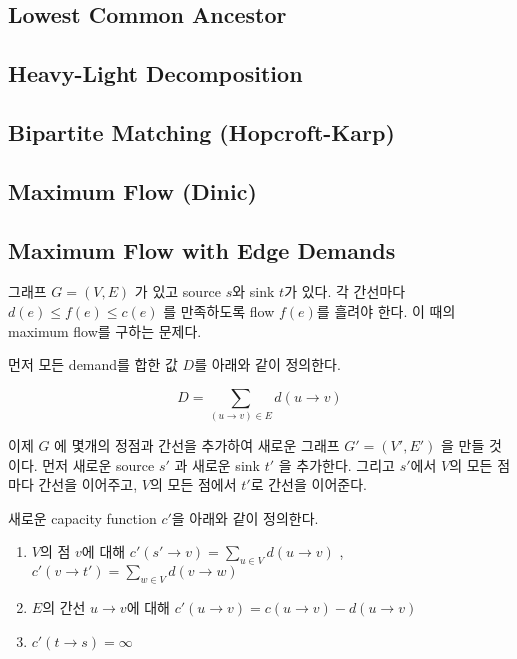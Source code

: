 \documentclass[10pt,landscape,a4paper,twocolumn]{article}
\begin{document}
\subsection{Lowest Common Ancestor}


\subsection{Heavy-Light Decomposition}


\subsection{Bipartite Matching (Hopcroft-Karp)}


\subsection{Maximum Flow (Dinic)}


\subsection{Maximum Flow with Edge Demands}

그래프 $G=(V,E)$ 가 있고 source $s$와 sink $t$가 있다. 각 간선마다 $d(e) \leq f(e) \leq c(e)$ 를 만족하도록 flow $f(e)$를 흘려야 한다. 이 때의 maximum flow를 구하는 문제다.

먼저 모든 demand를 합한 값 $D$를 아래와 같이 정의한다.

\begin{displaymath}
D = \sum_{(u \to v) \in E} d(u \to v)
\end{displaymath}

이제 $G$ 에 몇개의 정점과 간선을 추가하여 새로운 그래프 $G'=(V',E')$ 을 만들 것이다. 먼저 새로운 source $s'$ 과 새로운 sink $t'$ 을 추가한다. 그리고 $s'$에서 $V$의 모든 점마다 간선을 이어주고, $V$의 모든 점에서 $t'$로 간선을 이어준다.

새로운 capacity function $c'$을 아래와 같이 정의한다.

\begin{enumerate}
\item $V$의 점 $v$에 대해 $c'(s' \to v) = \sum_{u \in V} d(u \to v)$ , $c'(v \to t') = \sum_{w \in V} d(v \to w)$
\item $E$의 간선 $u \to v$에 대해 $c'(u \to v) = c(u \to v) - d(u \to v)$
\item $c'(t \to s) = \infty$
\end{enumerate}
\end{document}
